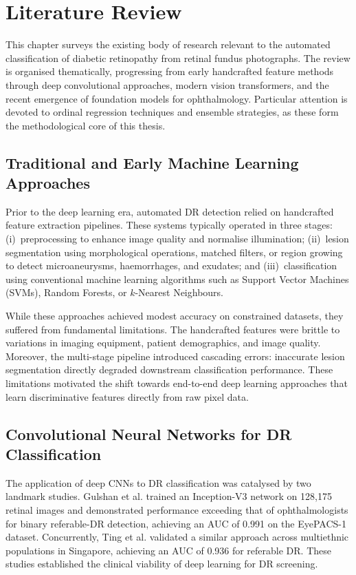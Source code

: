 \chapter{Literature Review}
\label{ch:literature}

This chapter surveys the existing body of research relevant to the automated classification of diabetic retinopathy from retinal fundus photographs. The review is organised thematically, progressing from early handcrafted feature methods through deep convolutional approaches, modern vision transformers, and the recent emergence of foundation models for ophthalmology. Particular attention is devoted to ordinal regression techniques and ensemble strategies, as these form the methodological core of this thesis.

\section{Traditional and Early Machine Learning Approaches}
\label{sec:traditional_ml}

Prior to the deep learning era, automated DR detection relied on handcrafted feature extraction pipelines. These systems typically operated in three stages: (i)~preprocessing to enhance image quality and normalise illumination; (ii)~lesion segmentation using morphological operations, matched filters, or region growing to detect microaneurysms, haemorrhages, and exudates; and (iii)~classification using conventional machine learning algorithms such as Support Vector Machines (SVMs), Random Forests, or $k$-Nearest Neighbours.

While these approaches achieved modest accuracy on constrained datasets, they suffered from fundamental limitations. The handcrafted features were brittle to variations in imaging equipment, patient demographics, and image quality. Moreover, the multi-stage pipeline introduced cascading errors: inaccurate lesion segmentation directly degraded downstream classification performance. These limitations motivated the shift towards end-to-end deep learning approaches that learn discriminative features directly from raw pixel data.

\section{Convolutional Neural Networks for DR Classification}
\label{sec:cnn_dr}

The application of deep CNNs to DR classification was catalysed by two landmark studies. Gulshan et al. \cite{gulshan2016development} trained an Inception-V3 network on 128,175 retinal images and demonstrated performance exceeding that of ophthalmologists for binary referable-DR detection, achieving an AUC of 0.991 on the EyePACS-1 dataset. Concurrently, Ting et al. \cite{ting2017development} validated a similar approach across multiethnic populations in Singapore, achieving an AUC of 0.936 for referable DR. These studies established the clinical viability of deep learning for DR screening.

